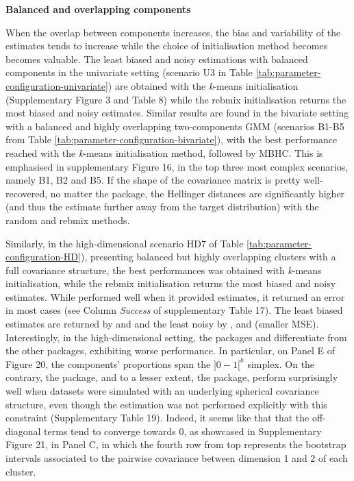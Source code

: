 \textbf{Balanced and overlapping components}

When the overlap between components increases, the bias and variability of the estimates tends to increase while the choice of initialisation method becomes becomes valuable.
The least biased and noisy estimations with balanced components in the univariate setting (scenario U3 in Table
\ref{tab:parameter-configuration-univariate}) are obtained with
the \emph{k}-means initialisation (Supplementary Figure
3 and Table 8) while the rebmix initialisation returns the most biased and noisy
estimates. Similar results are found in the bivariate setting with a balanced and highly overlapping two-components GMM (scenarios B1-B5 from Table \ref{tab:parameter-configuration-bivariate}), with the best performance reached with the \emph{k}-means initialisation method, followed by MBHC. This is emphasised in supplementary Figure 16, in the top three most complex scenarios, namely B1, B2 and B5. If the shape of the covariance matrix is pretty well-recovered, no matter the package, the Hellinger distances are significantly higher (and thus the estimate further away from the target distribution) with the random and rebmix methods.

Similarly, in the high-dimensional scenario HD7 of Table \ref{tab:parameter-configuration-HD}), presenting balanced but highly overlapping clusters with a full covariance structure, the best performances was obtained with \emph{k}-means initialisation, while the rebmix initialisation returns the most biased and noisy estimates. While  performed well when it provided estimates, it returned an error in most cases (see Column \emph{Success} of supplementary Table 17). The least biased estimates are returned by  and  and the least noisy by ,  and  (smaller MSE). Interestingly, in the high-dimensional setting, the packages  and  differentiate from the other packages, exhibiting worse performance. In particular, on Panel E of Figure 20, the components' proportions span the \(]0-1[^k\) simplex.
On the contrary, the  package, and to a lesser extent, the  package, perform surprisingly well when datasets were simulated with an underlying spherical covariance structure, even though the estimation was not performed explicitly with this constraint (Supplementary Table 19). Indeed, it seems like that that the off-diagonal terms tend to converge towards 0, as showcased in Supplementary Figure 21, in Panel C, in which the fourth row from top represents the bootstrap intervals associated to the pairwise covariance between dimension 1 and 2 of each cluster.

